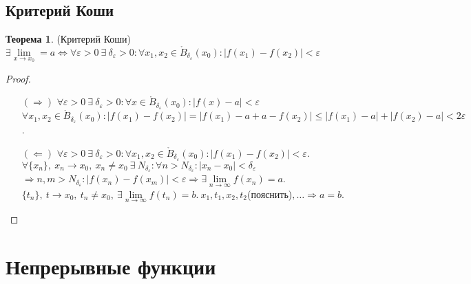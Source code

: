 \documentclass[a4paper, 12pt]{article}
\newcommand{\Bo}{\mathring{B}}
\renewcommand{\epsilon}{\varepsilon}
\newcommand\tab[1][.5cm]{\hspace*{#1}}
\newcommand{\lims}{\lim\limits_{n\to \infty}}
\theoremstyle{definition}
\newtheorem*{theorem}{Теорема}
\begin{document}
    \subsection{Критерий Коши}
        \begin{theorem} (Критерий Коши)\\
            $\exists \lim\limits_{x\to x_0}=a \Leftrightarrow \forall \epsilon>0\ \exists\ \delta_{\epsilon}>0: \forall x_1,x_2\in \Bo_{\delta_{\epsilon}}(x_0): |f(x_1)-f(x_2)|<\epsilon$
        \end{theorem} 
        \begin{proof}\tab
            \begin{itemize}
                \item[$(\Rightarrow)$] $\forall \epsilon>0\ \exists\ \delta_{\epsilon}>0: \forall x\in \Bo_{\delta_{\epsilon}}(x_0): |f(x)-a|<\epsilon$\\
                $\forall x_1,x_2\in \Bo_{\delta_{\epsilon}}(x_0): |f(x_1)-f(x_2)|=|f(x_1)-a+a-f(x_2)|\leq|f(x_1)-a|+|f(x_2)-a|<2\epsilon$.
                \item[$(\Leftarrow)$] $\forall \epsilon>0\ \exists\ \delta_{\epsilon}>0: \forall x_1,x_2\in \Bo_{\delta_{\epsilon}}(x_0): |f(x_1)-f(x_2)|<\epsilon$.\\
                $\forall \{x_n\},\ x_n\to x_0,\ x_n\ne x_0\ \exists\ N_{\delta_{\epsilon}}: \forall n> N_{\delta_{\epsilon}}: |x_n-x_0|<\delta_{\epsilon}$\\
                $\Rightarrow n,m>N_{\delta_{\epsilon}}: |f(x_n)-f(x_m)|<\epsilon \Rightarrow \exists\lims f(x_n)=a$.\\
                $\{t_n\},\ t\to x_0,\ t_n\ne x_0,\ \exists \lims f(t_n)=b.\ x_1, t_1, x_2, t_2 $(пояснить)$, \dots \Rightarrow a=b$.
            \end{itemize}
        \end{proof} 
    \section{Непрерывные функции}
\end{document}
